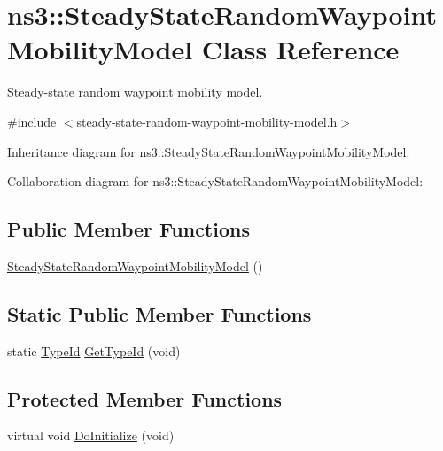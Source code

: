 \hypertarget{classns3_1_1SteadyStateRandomWaypointMobilityModel}{}\section{ns3\+:\+:Steady\+State\+Random\+Waypoint\+Mobility\+Model Class Reference}
\label{classns3_1_1SteadyStateRandomWaypointMobilityModel}


Steady-\/state random waypoint mobility model.  




{\ttfamily \#include $<$steady-\/state-\/random-\/waypoint-\/mobility-\/model.\+h$>$}



Inheritance diagram for ns3\+:\+:Steady\+State\+Random\+Waypoint\+Mobility\+Model\+:


Collaboration diagram for ns3\+:\+:Steady\+State\+Random\+Waypoint\+Mobility\+Model\+:
\subsection*{Public Member Functions}
\begin{DoxyCompactItemize}
\item 
\hyperlink{classns3_1_1SteadyStateRandomWaypointMobilityModel_abe26fde19d726cac14d0d21478e17a72}{Steady\+State\+Random\+Waypoint\+Mobility\+Model} ()
\end{DoxyCompactItemize}
\subsection*{Static Public Member Functions}
\begin{DoxyCompactItemize}
\item 
static \hyperlink{classns3_1_1TypeId}{Type\+Id} \hyperlink{classns3_1_1SteadyStateRandomWaypointMobilityModel_a0d2dc8ad7334d901897aa58a8c369b54}{Get\+Type\+Id} (void)
\end{DoxyCompactItemize}
\subsection*{Protected Member Functions}
\begin{DoxyCompactItemize}
\item 
virtual void \hyperlink{classns3_1_1SteadyStateRandomWaypointMobilityModel_a9e27c674274fb626dca8e0a6ddf3f8f3}{Do\+Initialize} (void)
\end{DoxyCompactItemize}

